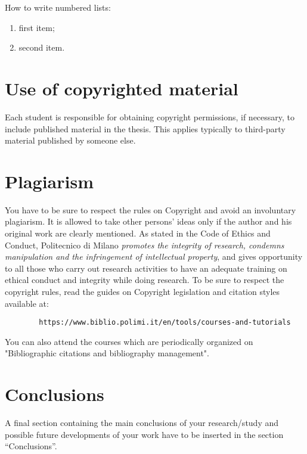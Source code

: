 \documentclass[11pt,a4paper]{article}
\begin{document}
    How to write numbered lists:

    \begin{enumerate}
        \item first item;
        \item second item.
    \end{enumerate}

\section{Use of copyrighted material}

    Each student is responsible for obtaining copyright permissions, if necessary, to include published material in the thesis. This applies typically to third-party material published by someone else.

\section{Plagiarism}

    You have to be sure to respect the rules on Copyright and avoid an involuntary plagiarism. It is allowed to take other persons' ideas only if the author and his original work are clearly mentioned. As stated in the Code of Ethics and Conduct, Politecnico di Milano \textit{promotes the integrity of research, condemns manipulation and the infringement of intellectual property}, and gives opportunity to all those who carry out research activities to have an adequate training on ethical conduct and integrity while doing research. To be sure to respect the copyright rules, read the guides on Copyright legislation and citation styles available at:

    \begin{verbatim}
        https://www.biblio.polimi.it/en/tools/courses-and-tutorials
    \end{verbatim}

    You can also attend the courses which are periodically organized on "Bibliographic citations and bibliography management".

\section{Conclusions}

    \color{black}
    A final section containing the main conclusions of your research/study
    and possible future developments of your work have to be inserted in the section ``Conclusions''.
\end{document}
